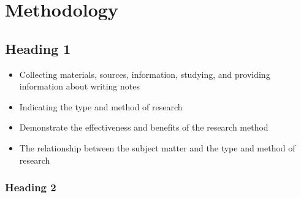 \chapter[Methodology]{Methodology}
\label{Chap:Methodology}




\section{Heading 1}
\begin{itemize}
	\item Collecting materials, sources, information, studying, and providing information about writing notes
	
	\item Indicating the type and method of research
	\item	Demonstrate the effectiveness and benefits of the research method
	\item The relationship between the subject matter and the type and method of research
\end{itemize}
\subsection{Heading 2}
\lipsum[4] %

